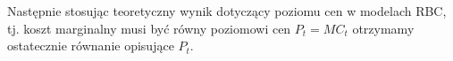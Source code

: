 
Następnie stosując teoretyczny wynik dotyczący poziomu cen w modelach RBC, tj. koszt marginalny musi być równy poziomowi cen $P_t = MC_t$ otrzymamy ostatecznie równanie opisujące $P_t$.


